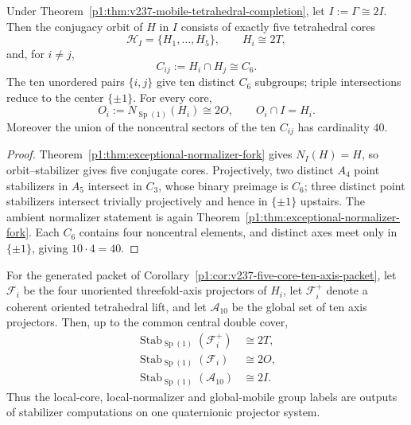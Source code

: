 \documentclass[11pt]{article}
\begin{document}
\begin{corollary}
\label{p1:cor:v237-five-core-ten-axis-packet}
Under Theorem~\ref{p1:thm:v237-mobile-tetrahedral-completion}, let
\(I:=\Gamma\cong2I\).  Then the conjugacy orbit of \(H\) in \(I\) consists
of exactly five tetrahedral cores
\[
 \mathcal H_I=\{H_1,\ldots,H_5\},\qquad H_i\cong2T,
\]
and, for \(i\ne j\),
\[
 C_{ij}:=H_i\cap H_j\cong C_6.
\]
The ten unordered pairs \(\{i,j\}\) give ten distinct \(C_6\) subgroups;
triple intersections reduce to the center \(\{\pm1\}\).  For every core,
\[
 O_i:=N_{\operatorname{Sp}(1)}(H_i)\cong2O,
 \qquad O_i\cap I=H_i.
\]
Moreover the union of the noncentral sectors of the ten \(C_{ij}\) has
cardinality \(40\).
\end{corollary}

\begin{proof}
Theorem~\ref{p1:thm:exceptional-normalizer-fork} gives
\(N_I(H)=H\), so orbit--stabilizer gives five conjugate cores.  Projectively,
two distinct \(A_4\) point stabilizers in \(A_5\) intersect in \(C_3\), whose
binary preimage is \(C_6\); three distinct point stabilizers intersect
trivially projectively and hence in \(\{\pm1\}\) upstairs.  The ambient
normalizer statement is again Theorem~\ref{p1:thm:exceptional-normalizer-fork}.
Each \(C_6\) contains four noncentral elements, and distinct axes meet only in
\(\{\pm1\}\), giving \(10\cdot4=40\).
\end{proof}

\begin{corollary}
\label{p1:cor:v237-exceptional-stabilizer-characterization}
For the generated packet of Corollary~\ref{p1:cor:v237-five-core-ten-axis-packet},
let \(\mathcal F_i\) be the four unoriented threefold-axis projectors of
\(H_i\), let \(\mathcal F_i^+\) denote a coherent oriented tetrahedral lift,
and let \(\mathcal A_{10}\) be the global set of ten axis projectors.  Then,
up to the common central double cover,
\[
 \boxed{
 \begin{aligned}
  \operatorname{Stab}_{\operatorname{Sp}(1)}(\mathcal F_i^+) &\cong 2T,\\
  \operatorname{Stab}_{\operatorname{Sp}(1)}(\mathcal F_i) &\cong 2O,\\
  \operatorname{Stab}_{\operatorname{Sp}(1)}(\mathcal A_{10}) &\cong 2I.
 \end{aligned}}
\]
Thus the local-core, local-normalizer and global-mobile group labels are
outputs of stabilizer computations on one quaternionic projector system.
\end{corollary}
\end{document}
